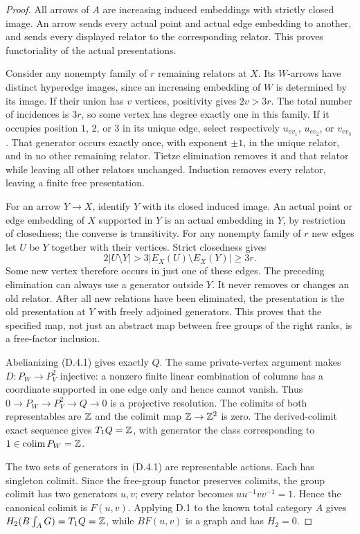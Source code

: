 \begin{proof}
All arrows of $A$ are increasing induced embeddings with strictly
closed image. An arrow sends every actual point and actual edge
embedding to another, and sends every displayed relator to the
corresponding relator. This proves functoriality of the actual
presentations.

Consider any nonempty family of $r$ remaining relators at $X$.
Its $W$-arrows have distinct hyperedge images, since an increasing
embedding of $W$ is determined by its image. If their union has
$v$ vertices, positivity gives $2v>3r$. The total number of
incidences is $3r$, so some vertex has degree exactly one in
this family. If it occupies position $1$, $2$, or $3$ in its
unique edge, select respectively $u_{ev_1}$, $u_{ev_2}$, or
$v_{ev_3}$. That generator occurs exactly once, with exponent
$\pm1$, in the unique relator, and in no other remaining relator.
Tietze elimination removes it and that relator while leaving
all other relators unchanged. Induction removes every relator,
leaving a finite free presentation.

For an arrow $Y\to X$, identify $Y$ with its closed induced
image. An actual point or edge embedding of $X$ supported in
$Y$ is an actual embedding in $Y$, by restriction of closedness;
the converse is transitivity. For any nonempty family of $r$
new edges let $U$ be $Y$ together with their vertices.
Strict closedness gives
\[
 2|U\setminus Y|>
 3|E_X(U)\setminus E_X(Y)|\geq3r.
\]
Some new vertex therefore occurs in just one of these edges.
The preceding elimination can always use a generator outside
$Y$. It never removes or changes an old relator. After all new
relations have been eliminated, the presentation is the old
presentation at $Y$ with freely adjoined generators. This proves
that the specified map, not just an abstract map between free
groups of the right ranks, is a free-factor inclusion.

Abelianizing (D.4.1) gives exactly $Q$. The same private-vertex
argument makes $D:P_W\to P_V^2$ injective: a nonzero finite
linear combination of columns has a coordinate supported in
one edge only and hence cannot vanish. Thus
$0\to P_W\to P_V^2\to Q\to0$ is a projective resolution.
The colimits of both representables are $\mathbb Z$ and the colimit
map $\mathbb Z\to\mathbb Z^2$ is zero. The derived-colimit exact sequence
gives $T_1Q=\mathbb Z$, with generator the class corresponding to
$1\in\operatorname*{colim} P_W=\mathbb Z$.

The two sets of generators in (D.4.1) are representable actions.
Each has singleton colimit. Since the free-group functor preserves
colimits, the group colimit has two generators $u,v$; every
relator becomes $uu^{-1}vv^{-1}=1$. Hence the canonical colimit
is $F(u,v)$. Applying D.1 to the known total category $A$ gives
$H_2(B\int_A G)=T_1Q=\mathbb Z$, while $BF(u,v)$ is a graph and
has $H_2=0$.


\end{proof}
